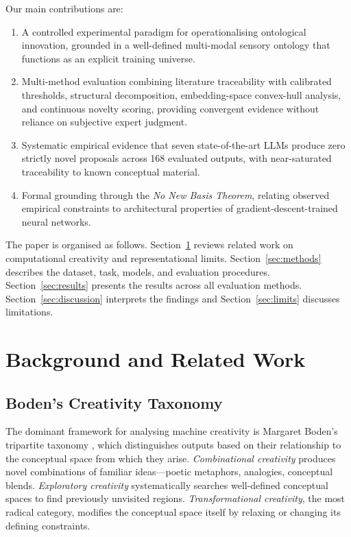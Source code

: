 \documentclass[pdflatex,sn-mathphys-num]{sn-jnl}
\begin{document}
Our main contributions are:

\begin{enumerate}
\item A controlled experimental paradigm for operationalising ontological innovation, grounded
      in a well-defined multi-modal sensory ontology that functions as an explicit training
      universe.
\item Multi-method evaluation combining literature traceability with calibrated thresholds,
      structural decomposition, embedding-space convex-hull analysis, and continuous novelty
      scoring, providing convergent evidence without reliance on subjective expert judgment.
\item Systematic empirical evidence that seven state-of-the-art LLMs produce zero strictly
      novel proposals across 168 evaluated outputs, with near-saturated traceability to known
      conceptual material.
\item Formal grounding through the \emph{No New Basis Theorem}, relating observed empirical
      constraints to architectural properties of gradient-descent-trained neural networks.
\end{enumerate}

The paper is organised as follows.  Section~\ref{sec:related} reviews related work on
computational creativity and representational limits.  Section~\ref{sec:methods} describes the
dataset, task, models, and evaluation procedures.  Section~\ref{sec:results} presents the
results across all evaluation methods.  Section~\ref{sec:discussion} interprets the findings
and Section~\ref{sec:limits} discusses limitations.

\section{Background and Related Work}
\label{sec:related}

\subsection{Boden's Creativity Taxonomy}

The dominant framework for analysing machine creativity is Margaret Boden's tripartite
taxonomy \cite{boden2004creative}, which distinguishes outputs based on their relationship to
the conceptual space from which they arise.  \emph{Combinational creativity} produces novel
combinations of familiar ideas---poetic metaphors, analogies, conceptual blends.
\emph{Exploratory creativity} systematically searches well-defined conceptual spaces to find
previously unvisited regions.  \emph{Transformational creativity}, the most radical category,
modifies the conceptual space itself by relaxing or changing its defining constraints.
\end{document}
